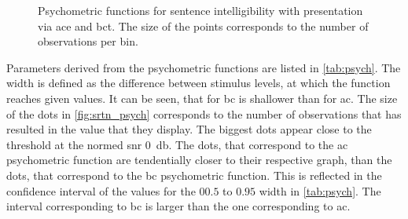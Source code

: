 \begin{figure}[H] 
\centering

\caption{Psychometric functions for sentence intelligibility with presentation via \gls{ace} and \gls{bct}. The size of the points corresponds to the number of observations per bin.}
\label{fig:srtn_psych}
\end{figure}




Parameters derived from the psychometric functions are listed in \autoref{tab:psych}. The width is defined  as the difference between stimulus levels, at which the function reaches given values. 
It can be seen, that for \gls{bc} is shallower than for \gls{ac}.
The size of the dots in \autoref{fig:srtn_psych} corresponds to the number of observations that has resulted in the value that they display. The biggest dots appear close to the threshold at the normed \gls{snr} \SI{0}{\decibel}.
The dots, that correspond to the \gls{ac} psychometric function are tendentially closer to their respective graph, than the dots, that correspond to the \gls{bc} psychometric function.
This is reflected in the confidence interval of the values for the $00.5$ to $0.95$ width in \autoref{tab:psych}. The interval corresponding to \gls{bc} is larger than the one corresponding to \gls{ac}. 



